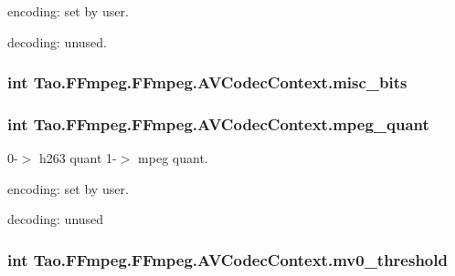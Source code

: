 \begin{DoxyItemize}
\item encoding: set by user.
\item decoding: unused. 
\end{DoxyItemize}\hypertarget{struct_tao_1_1_f_fmpeg_1_1_f_fmpeg_1_1_a_v_codec_context_ad4d46f76db90739f685e7554cea3f749}{
\subsubsection[{misc\_\-bits}]{\setlength{\rightskip}{0pt plus 5cm}int {\bf Tao.FFmpeg.FFmpeg.AVCodecContext.misc\_\-bits}}}
\label{struct_tao_1_1_f_fmpeg_1_1_f_fmpeg_1_1_a_v_codec_context_ad4d46f76db90739f685e7554cea3f749}
\hypertarget{struct_tao_1_1_f_fmpeg_1_1_f_fmpeg_1_1_a_v_codec_context_a9a7a1ee0c39ad4c2b4c225c8bdad582c}{
\subsubsection[{mpeg\_\-quant}]{\setlength{\rightskip}{0pt plus 5cm}int {\bf Tao.FFmpeg.FFmpeg.AVCodecContext.mpeg\_\-quant}}}
\label{struct_tao_1_1_f_fmpeg_1_1_f_fmpeg_1_1_a_v_codec_context_a9a7a1ee0c39ad4c2b4c225c8bdad582c}
0-\/$>$ h263 quant 1-\/$>$ mpeg quant.
\begin{DoxyItemize}
\item encoding: set by user.
\item decoding: unused 
\end{DoxyItemize}\hypertarget{struct_tao_1_1_f_fmpeg_1_1_f_fmpeg_1_1_a_v_codec_context_afc033e4f7de2930d3a6ad7d8cae1f8b6}{
\subsubsection[{mv0\_\-threshold}]{\setlength{\rightskip}{0pt plus 5cm}int {\bf Tao.FFmpeg.FFmpeg.AVCodecContext.mv0\_\-threshold}}}
